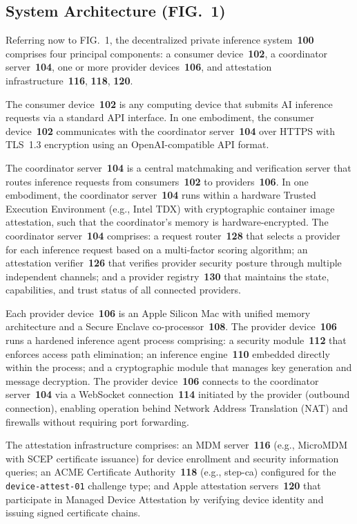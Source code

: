\documentclass[11pt,letterpaper]{article}
\begin{document}
\subsection{System Architecture (FIG.~1)}

Referring now to FIG.~1, the decentralized private inference system~\textbf{100} comprises four principal components: a consumer device~\textbf{102}, a coordinator server~\textbf{104}, one or more provider devices~\textbf{106}, and attestation infrastructure~\textbf{116}, \textbf{118}, \textbf{120}.

The consumer device~\textbf{102} is any computing device that submits AI inference requests via a standard API interface. In one embodiment, the consumer device~\textbf{102} communicates with the coordinator server~\textbf{104} over HTTPS with TLS~1.3 encryption using an OpenAI-compatible API format.

The coordinator server~\textbf{104} is a central matchmaking and verification server that routes inference requests from consumers~\textbf{102} to providers~\textbf{106}. In one embodiment, the coordinator server~\textbf{104} runs within a hardware Trusted Execution Environment (e.g., Intel TDX) with cryptographic container image attestation, such that the coordinator's memory is hardware-encrypted. The coordinator server~\textbf{104} comprises: a request router~\textbf{128} that selects a provider for each inference request based on a multi-factor scoring algorithm; an attestation verifier~\textbf{126} that verifies provider security posture through multiple independent channels; and a provider registry~\textbf{130} that maintains the state, capabilities, and trust status of all connected providers.

Each provider device~\textbf{106} is an Apple Silicon Mac with unified memory architecture and a Secure Enclave co-processor~\textbf{108}. The provider device~\textbf{106} runs a hardened inference agent process comprising: a security module~\textbf{112} that enforces access path elimination; an inference engine~\textbf{110} embedded directly within the process; and a cryptographic module that manages key generation and message decryption. The provider device~\textbf{106} connects to the coordinator server~\textbf{104} via a WebSocket connection~\textbf{114} initiated by the provider (outbound connection), enabling operation behind Network Address Translation (NAT) and firewalls without requiring port forwarding.

The attestation infrastructure comprises: an MDM server~\textbf{116} (e.g., MicroMDM with SCEP certificate issuance) for device enrollment and security information queries; an ACME Certificate Authority~\textbf{118} (e.g., step-ca) configured for the \texttt{device-attest-01} challenge type; and Apple attestation servers~\textbf{120} that participate in Managed Device Attestation by verifying device identity and issuing signed certificate chains.
\end{document}
